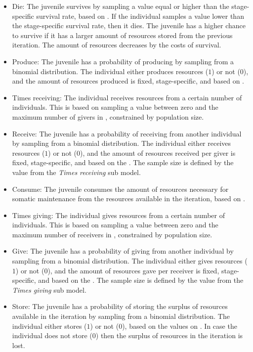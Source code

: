 \documentclass{article}
\begin{document}
\begin{itemize}
    \begin{itemize}
        \item Die: The juvenile survives by sampling a value equal or higher than the stage-specific survival rate, based on \cite{gurven2007longevity}. If the individual samples a value lower than the stage-specific survival rate, then it dies. The juvenile has a higher chance to survive if it has a larger amount of resources stored from the previous iteration. The amount of resources decreases by the costs of survival.
        \item Produce: The juvenile has a probability of producing by sampling from a binomial distribution. The individual either produces resources ($1$) or not ($0$), and the amount of resources produced is fixed, stage-specific, and based on \cite{koster2020life}.
        \item Times receiving: The individual receives resources from a certain number of individuals. This is based on sampling a value between zero and the maximum number of givers in \cite{gurven2004give}, constrained by population size.
        \item Receive: The juvenile has a probability of receiving from another individual by sampling from a binomial distribution. The individual either receives resources ($1$) or not ($0$), and the amount of resources received per giver is fixed, stage-specific, and based on the \cite{gurven2004give}. The sample size is defined by the value from the \emph{Times receiving} sub model. 
        \item Consume: The juvenile consumes the amount of resources necessary for somatic maintenance from the resources available in the iteration, based on \cite{kaplan2000theory,pontzer2021daily}.
        \item Times giving: The individual gives resources from a certain number of individuals. This is based on sampling a value between zero and the maximum number of receivers in \cite{gurven2004give}, constrained by population size.
        \item Give: The juvenile has a probability of giving from another individual by sampling from a binomial distribution. The individual either gives resources ($1$) or not ($0$), and the amount of resources gave per receiver is fixed, stage-specific, and based on the \cite{gurven2004give}. The sample size is defined by the value from the \emph{Times giving} sub model. 
        \item Store: The juvenile has a probability of storing the surplus of resources available in the iteration by sampling from a binomial distribution. The individual either stores ($1$) or not ($0$), based on the values on \citep{bowles2011cultivation}. In case the individual does not store ($0$) then the surplus of resources in the iteration is lost.

\end{itemize}
\end{itemize}
\end{document}
